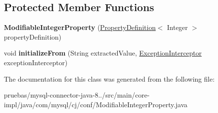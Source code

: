 \subsection*{Protected Member Functions}
\begin{DoxyCompactItemize}
\item 
\mbox{\label{classcom_1_1mysql_1_1cj_1_1conf_1_1_modifiable_integer_property_a1ea2683fa5bcf5648e5d17b9be07b5c9}} 
{\bfseries Modifiable\+Integer\+Property} (\mbox{\hyperlink{interfacecom_1_1mysql_1_1cj_1_1conf_1_1_property_definition}{Property\+Definition}}$<$ Integer $>$ property\+Definition)
\item 
\mbox{\label{classcom_1_1mysql_1_1cj_1_1conf_1_1_modifiable_integer_property_a8114f79a3efc1afba11f5637bb3d7b85}} 
void {\bfseries initialize\+From} (String extracted\+Value, \mbox{\hyperlink{interfacecom_1_1mysql_1_1cj_1_1exceptions_1_1_exception_interceptor}{Exception\+Interceptor}} exception\+Interceptor)
\end{DoxyCompactItemize}


The documentation for this class was generated from the following file\+:\begin{DoxyCompactItemize}
\item 
pruebas/mysql-\/connector-\/java-\/8../src/main/core-\/impl/java/com/mysql/cj/conf/Modifiable\+Integer\+Property.\+java\end{DoxyCompactItemize}
